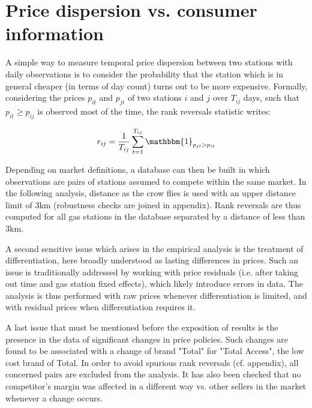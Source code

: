 \documentclass[11pt]{article}
\begin{document}
\section{Price dispersion vs. consumer information}

A simple way to measure temporal price dispersion between two stations with daily observations is to consider the probability that the station which is in general cheaper (in terms of day count) turns out to be more expensive. Formally, considering the prices $p_{it}$ and $p_{jt}$ of two stations $i$ and $j$ over $T_{ij}$ days, such that $p_{it} \ge p_{ij}$ is observed most of the time, the rank reversals statistic writes:

\begin{align*}
r_{ij} = \frac{1}{T_{ij}} \sum_{t=1}^{T_{ij}} \mathbbm{1}_{p_{jt} > p_{it}}
\end{align*}

Depending on market definitions, a database can then be built in which observations are pairs of stations assumed to compete within the same market. In the following analysis, distance as the crow flies is used with an upper distance limit of 3km (robustness checks are joined in appendix). Rank reversals are thus computed for all gas stations in the database separated by a distance of less than 3km.

A second sensitive issue which arises in the empirical analysis is the treatment of differentiation, here broadly understood as lasting differences in prices. Such an issue is traditionally addressed by working with price residuals (i.e. after taking out time and gas station fixed effects), which likely introduce errors in data. The analysis is thus performed with raw prices whenever differentiation is limited, and with residual prices when differentiation requires it.

A last issue that must be mentioned before the exposition of results is the presence in the data of significant changes in price policies. Such changes are found to be associated with a change of brand "Total" for "Total Access", the low cost brand of Total. In order to avoid spurious rank reversals (cf. appendix), all concerned pairs are excluded from the analysis. It has also been checked that no competitor's margin was affected in a different way vs. other sellers in the market whenever a change occurs.
\end{document}
